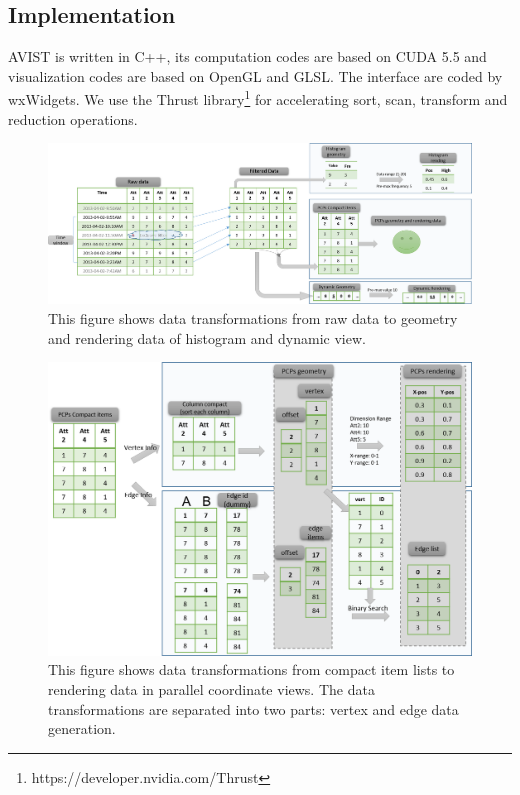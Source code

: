 
 
\subsection{Implementation}
AVIST is written in C++, its computation codes are based on CUDA 5.5 and visualization codes are based on OpenGL and GLSL. The interface are coded by wxWidgets. We use the Thrust library\footnote{https://developer.nvidia.com/Thrust} for accelerating sort, scan, transform and reduction operations.


\begin{figure}[htb]
	\centering
	\includegraphics[width=1.0\linewidth]{pic/dataTran1.png}
	\parbox[t]{1.0\columnwidth}{\relax
	}
	\caption{\label{fig:dataTran1} This figure shows data transformations from raw data to  geometry and rendering data of histogram and dynamic view.}
\end{figure} 

\begin{figure}[htb]
	\centering
	\includegraphics[width=1.0\linewidth]{pic/dataTran2.png}
	\parbox[t]{1.0\columnwidth}{\relax
	}
	\caption{\label{fig:dataTran2} This figure shows data transformations from compact item lists to rendering data in parallel coordinate views. The data transformations are separated into two parts: vertex and edge data generation.}
\end{figure} 

